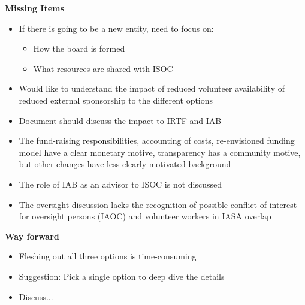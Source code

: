 \documentclass[helvetica,a4paper,landscape]{seminar}
\newcommand{\heading}[1]{%
  \begin{center} 
    \large\bf 
    #1 
  \end{center} 
  \vspace{.4 in}}
\begin{document}
\begin{slide}
\heading{Missing Items}
{\footnotesize
\begin{itemize}
\item If there is going to be a new entity, need to focus on:
\begin{itemize}
\item How the board is formed
\item What resources are shared with ISOC
\end{itemize}

\item Would like to understand the impact of reduced volunteer availability of reduced external sponsorship to the different options
\item Document should discuss the impact to IRTF and IAB
\item The fund-raising responsibilities, accounting of costs, re-envisioned funding model have a clear monetary motive, transparency has a community motive, but other changes have less clearly motivated background
\item The role of IAB as an advisor to ISOC is not discussed
\item The oversight discussion lacks the recognition of possible conflict of interest for oversight persons (IAOC) and volunteer workers in IASA overlap
\end{itemize}
}
\end{slide}


\begin{slide}

\heading{Way forward}

\begin{itemize}
\item Fleshing out all three options is time-consuming
\item Suggestion: Pick a single option to deep dive the details
\item Discuss...
\end{itemize}

\end{slide}
\end{document}
